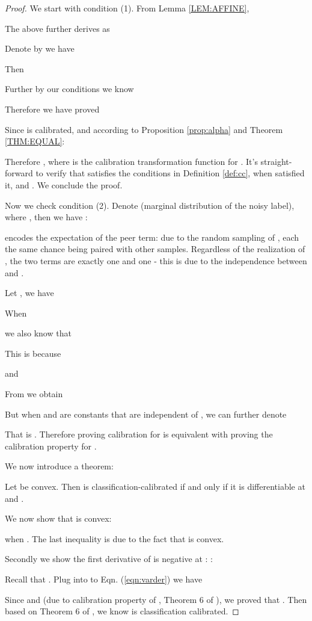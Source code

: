 \begin{proof}
We start with condition (1). From Lemma \ref{LEM:AFFINE},

The above further derives as


Denote by  we have 

Then

Further by our conditions we know

Therefore we have proved

Since  is calibrated, and according to Proposition \ref{prop:alpha} and Theorem \ref{THM:EQUAL}:

Therefore , where  is the calibration transformation function for . It's straight-forward to verify that  satisfies the conditions in Definition \ref{def:cc}, when  satisfied it,  and . We conclude the proof.

Now we check condition (2). 
Denote  (marginal distribution of the noisy label), where , then we have :

 encodes the expectation of the peer term: due to the random sampling of , each  the same chance  being paired with other samples. Regardless of the realization of , the two terms are exactly one  and one  - this is due to the independence between  and .

Let , we have

When

we also know that

This is because

and

From  we obtain

But when  and  are constants that are independent of , we can further denote

That is . Therefore proving calibration for  is equivalent with proving the calibration property for .

We now introduce a theorem:
\begin{theorem}
    Let  be convex. Then  is classification-calibrated if and only if it is differentiable at  and .
\end{theorem}
We now show that  is convex:

when . The last inequality is due to the fact that  is convex.

Secondly we show the first derivative of  is negative at : :

Recall that
. Plug into to Eqn. (\ref{eqn:varder}) we have

Since  and  (due to calibration property of , Theorem 6 of \cite{bartlett2006convexity}), we proved that . Then based on Theorem 6 of \cite{bartlett2006convexity}, we know  is classification calibrated.
\end{proof}



